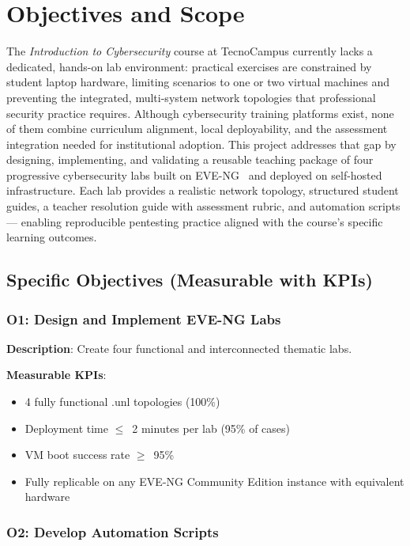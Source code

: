 \chapter{Objectives and Scope}
\label{ch:objectives}

The \textit{Introduction to Cybersecurity} course at TecnoCampus currently lacks a dedicated, hands-on lab environment:
practical exercises are constrained by student laptop hardware, limiting scenarios to one or two virtual machines
and preventing the integrated, multi-system network topologies that professional security practice requires.
Although cybersecurity training platforms exist, none of them combine curriculum alignment, local deployability,
and the assessment integration needed for institutional adoption. This project addresses that gap by
designing, implementing, and validating a reusable teaching package of four progressive cybersecurity
labs built on EVE-NG~\cite{eve_ng} and deployed on self-hosted infrastructure. Each lab provides
a realistic network topology, structured student guides, a teacher resolution guide with assessment
rubric, and automation scripts --- enabling reproducible pentesting practice aligned with the
course's specific learning outcomes.

\section{Specific Objectives (Measurable with KPIs)}

\subsection{O1: Design and Implement EVE-NG Labs}

\textbf{Description}: Create four functional and interconnected thematic labs.

\textbf{Measurable KPIs}:
\begin{itemize}
\item 4 fully functional .unl topologies (100\%)
\item Deployment time $\leq$~2 minutes per lab (95\% of cases)
\item VM boot success rate $\geq$~95\%
\item Fully replicable on any EVE-NG Community Edition instance with equivalent hardware
\end{itemize}

\subsection{O2: Develop Automation Scripts}

